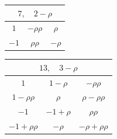 \begin{center}
\begin{tabular}[t]{c|c|c}
\multicolumn{3}{c}{$7,\quad2-\rho$}\\\hline
$1$&$-\rho\rho$&$\rho$\\
$-1$&$\rho\rho$&$-\rho$
\end{tabular}\qquad
\begin{tabular}[t]{c|c|c}
\multicolumn{3}{c}{$13,\quad3-\rho$}\\\hline
$1$&$1-\rho$&$-\rho\rho$\\
$1-\rho\rho$&$\rho$&$\rho-\rho\rho$\\
$-1$&$-1+\rho$&$\rho\rho$\\
$-1+\rho\rho$&$-\rho$&$-\rho+\rho\rho$
\end{tabular}
\end{center}\endgroup
